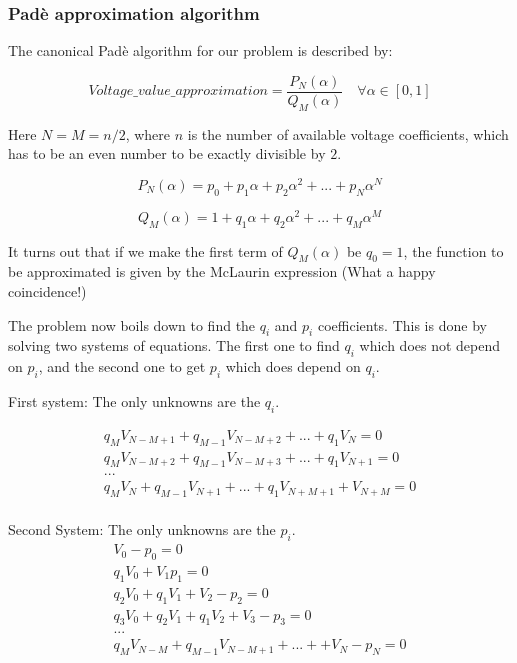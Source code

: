 \documentclass[11pt,fleqn]{book} %
\begin{document}
\subsubsection{Padè approximation algorithm}

The canonical Padè algorithm for our problem is described by:

\begin{equation}
Voltage\_value\_approximation = \frac{P_N(\alpha)}{Q_M(\alpha)} \quad \forall \alpha \in [0,1]
\label{eq:pade_apprx}
\end{equation}

Here $N=M=n/2$, where $n$ is the number of available voltage coefficients, which has to be an even number to be exactly divisible by $2$.

\begin{equation}
P_N(\alpha) = p_0 + p_1\alpha + p_2\alpha^2 + ... + p_N\alpha^N
\end{equation}

\begin{equation}
Q_M(\alpha) = 1 + q_1\alpha + q_2\alpha^2 + ... + q_M\alpha^M
\end{equation}

It turns out that if we make the first term of $Q_M(\alpha)$ be $q_0=1$, the function to be approximated is given by the McLaurin expression (What a happy coincidence!)

The problem now boils down to find the $q_i$ and $p_i$ coefficients. This is done by solving two systems of equations. The first one to find $q_i$ which does not depend on $p_i$, and the second one to get $p_i$ which does depend on $q_i$.

First system: The only unknowns are the $q_i$.

\begin{equation}
\begin{matrix}
q_M V_{N-M+1} + q_{M-1}V_{N-M+2}+...+q_1V_N = 0\\
q_M V_{N-M+2} + q_{M-1}V_{N-M+3}+...+q_1V_{N+1} = 0\\
...\\
q_M V_{N} + q_{M-1}V_{N+1}+...+q_1V_{N+M+1} + V_{N+M} = 0\\
\end{matrix}
\end{equation}

Second System: The only unknowns are the $p_i$.
\begin{equation}
\begin{matrix}
V_0 - p_0=0\\
q_1V_0 + V_1  p_1=0\\
q_2V_0 + q_1V_1+V_2-p_2=0\\
q_3V_0 + q_2V_1 + q_1V_2 + V_3 - p_3 = 0\\
...\\
q_MV_{N-M} + q_{M-1}V_{N-M+1} + ... + +V_N - p_N=0
\end{matrix}
\end{equation}
\end{document}
